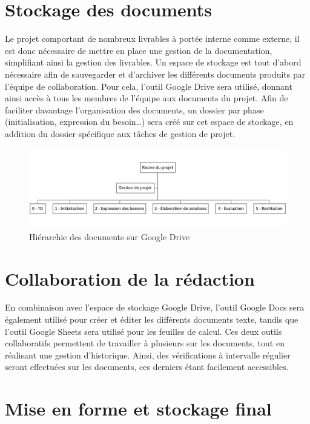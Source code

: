 
\section{Stockage des documents}

Le projet comportant de nombreux livrables à portée interne comme externe, il est donc nécessaire de mettre en place une gestion de la documentation, simplifiant ainsi la gestion des livrables. Un espace de stockage est tout d’abord nécessaire afin de sauvegarder et d’archiver les différents documents produits par l’équipe de collaboration. Pour cela, l’outil Google Drive sera utilisé, donnant ainsi accès à tous les membres de l’équipe aux documents du projet. Afin de faciliter davantage l’organisation des documents, un dossier par phase (initialisation, expression du besoin…) sera créé sur cet espace de stockage, en addition du dossier spécifique aux tâches de gestion de projet.
 
\begin{figure}[H]
    \centering
    \label{fig-arbo}
    \includegraphics[scale=0.65]{figures/arbo.png}
    \caption{Hiérarchie des documents sur Google Drive }
\end{figure}

\section{Collaboration de la rédaction}

En combinaison avec l’espace de stockage Google Drive, l’outil Google Docs sera également utilisé pour créer et éditer les différents documents texte, tandis que l’outil Google Sheets sera utilisé pour les feuilles de calcul. Ces deux outils collaboratifs permettent de travailler à plusieurs sur les documents, tout en réalisant une gestion d’historique. Ainsi, des vérifications à intervalle régulier seront effectuées sur les documents, ces derniers étant facilement accessibles.
 
\section{Mise en forme et stockage final}

